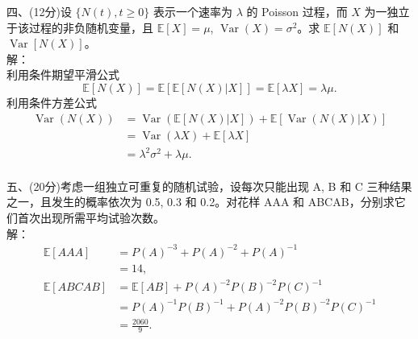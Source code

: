 \documentclass[UTF8,openany]{book}
\begin{document}
\noindent 四、(12分)设 $\{N(t), t \geq 0\}$ 表示一个速率为 $\lambda$ 的 Poisson 过程，而 $X$ 为一独立于该过程的非负随机变量，且 $\mathbb{E}[X] = \mu$, $\operatorname{Var}(X) = \sigma^2$。求 $\mathbb{E}[N(X)]$ 和 $\operatorname{Var}[N(X)]$。\\
解：\\
利用条件期望平滑公式
$$
\mathbb{E}[N(X)]=\mathbb{E}[\mathbb{E}[N(X)|X]]=\mathbb{E}[\lambda X]=\lambda\mu.
$$
利用条件方差公式
$$
\begin{aligned}
	\operatorname{Var}(N(X))&=\operatorname{Var}(\mathbb{E}[N(X)|X])+\mathbb{E}[\operatorname{Var}(N(X)|X)]\\
	&=\operatorname{Var}(\lambda X)+\mathbb{E}[\lambda X]\\
	&=\lambda^2\sigma^2+\lambda\mu.
\end{aligned}
$$\\


\noindent 五、(20分)考虑一组独立可重复的随机试验，设每次只能出现 A, B 和 C 三种结果之一，且发生的概率依次为 0.5, 0.3 和 0.2。对花样 AAA 和 ABCAB，分别求它们首次出现所需平均试验次数。\\
解：\\
\begin{align*}
	\mathbb{E}[AAA]&=P(A)^{-3}+P(A)^{-2}+P(A)^{-1}\\
	&=14,\\
	\mathbb{E}[ABCAB]&=\mathbb{E}[AB]+P(A)^{-2}P(B)^{-2}P(C)^{-1}\\  &=P(A)^{-1}P(B)^{-1}+P(A)^{-2}P(B)^{-2}P(C)^{-1}\\
	&=\frac{2060}{9}.
\end{align*}\\
\end{document}
